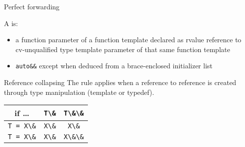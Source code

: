 \begin{frame}{Perfect forwarding}{}
  \begin{definition}
    A  is:
    \begin{itemize}
    \item
      a function parameter of a function template declared as rvalue reference to cv-unqualified type template parameter of that same function template
    \item
      \lstinline!auto&&! except when deduced from a brace-enclosed initializer list
    \end{itemize}
  \end{definition}
  \begin{block}{Reference collapsing}
    The  rule applies when a reference to reference is created through type manipulation (template or typedef).

    \begin{center}
      \begin{tabular}{|c||c|c|}
      \hline
        if \ldots          & \lstinline!T\&! & \lstinline!T\&\&!  \\
      \hline
      \hline
      \lstinline!T = X\&!  & \lstinline!X\&! & \lstinline!X\&!   \\
      \hline
      \lstinline!T = X\&!  & \lstinline!X\&! & \lstinline!X\&\&!  \\
      \hline
      \end{tabular}
    \end{center}
  \end{block}
\end{frame}

